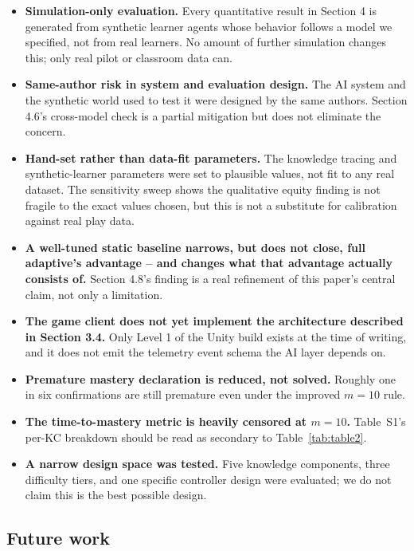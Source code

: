 \documentclass[11pt]{article}
\begin{document}
\begin{itemize}
\item \textbf{Simulation-only evaluation.} Every quantitative result in Section 4 is generated from synthetic learner agents whose behavior follows a model we specified, not from real learners. No amount of further simulation changes this; only real pilot or classroom data can.
\item \textbf{Same-author risk in system and evaluation design.} The AI system and the synthetic world used to test it were designed by the same authors. Section 4.6's cross-model check is a partial mitigation but does not eliminate the concern.
\item \textbf{Hand-set rather than data-fit parameters.} The knowledge tracing and synthetic-learner parameters were set to plausible values, not fit to any real dataset. The sensitivity sweep shows the qualitative equity finding is not fragile to the exact values chosen, but this is not a substitute for calibration against real play data.
\item \textbf{A well-tuned static baseline narrows, but does not close, full adaptive's advantage -- and changes what that advantage actually consists of.} Section 4.8's finding is a real refinement of this paper's central claim, not only a limitation.
\item \textbf{The game client does not yet implement the architecture described in Section 3.4.} Only Level 1 of the Unity build exists at the time of writing, and it does not emit the telemetry event schema the AI layer depends on.
\item \textbf{Premature mastery declaration is reduced, not solved.} Roughly one in six confirmations are still premature even under the improved $m{=}10$ rule.
\item \textbf{The time-to-mastery metric is heavily censored at $m{=}10$.} Table~S1's per-KC breakdown should be read as secondary to Table~\ref{tab:table2}.
\item \textbf{A narrow design space was tested.} Five knowledge components, three difficulty tiers, and one specific controller design were evaluated; we do not claim this is the best possible design.
\end{itemize}

\subsection{Future work}
\end{document}
